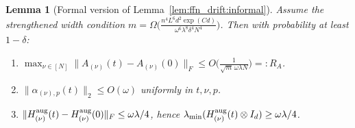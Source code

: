 \documentclass[11pt]{article}
\theoremstyle{plain}
\newtheorem{lemma}[theorem]{Lemma}
\begin{document}
\begin{lemma}[Formal version of Lemma~\ref{lem:ffn_drift:informal}]\label{lem:ffn_drift}
    Assume the strengthened width condition $m = \Omega\big(\frac{n^4 L^6 d^2 \exp(Cd)}{\omega^6 \lambda^8 \delta^4 N^4}\big)$. Then with probability at least $1-\delta$:
    \begin{enumerate}
        \item[\bf (i)] $\max_{\nu\in[N]}\|A_{(\nu)}(t) - A_{(\nu)}(0)\|_F \leq O\big(\frac{1}{\sqrt{m}\,\omega\lambda N}\big) =: R_A$.
        \item[\bf (ii)] $\|\alpha_{(\nu),p}(t)\|_2 \leq O(\omega)$ uniformly in $t,\nu,p$.
        \item[\bf (iii)] $\|H_{(\nu)}^{\rm aug}(t) - H_{(\nu)}^{\rm aug}(0)\|_F \le \omega\lambda/4$, hence $\lambda_{\min}(H_{(\nu)}^{\rm aug}(t)\otimes I_d) \ge \omega\lambda/4$.
    \end{enumerate}
\end{lemma}
\end{document}
